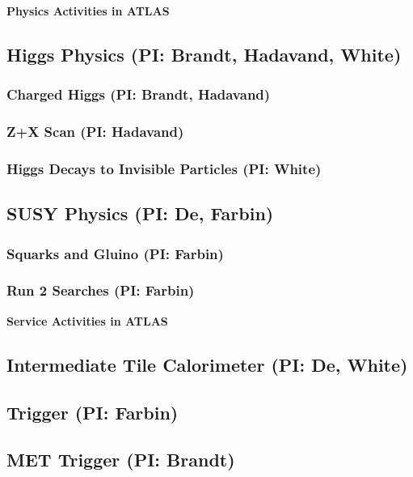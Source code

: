 \documentclass[11pt]{article}
\def\twohead#1{\subsection{#1}}
\def\threehead#1{\subsubsection{#1}}
\def\centerhead#1{
	\begin{center}
	\Large\textbf{#1}
	\end{center}}
\begin{document}




\centerhead{Physics Activities in ATLAS}

\twohead{Higgs Physics (PI: Brandt, Hadavand, White)}



\threehead{Charged Higgs (PI: Brandt, Hadavand)}


\threehead{Z+X Scan (PI: Hadavand)}


\threehead{Higgs Decays to Invisible Particles (PI: White)}


\twohead{SUSY Physics (PI: De, Farbin)}



\threehead{Squarks and Gluino (PI: Farbin)}

\threehead{Run 2 Searches (PI: Farbin)}



\centerhead{Service Activities in ATLAS}

\twohead{Intermediate Tile Calorimeter (PI: De, White)}


\twohead{Trigger (PI: Farbin)}


\twohead{MET Trigger (PI: Brandt)}

\end{document}
